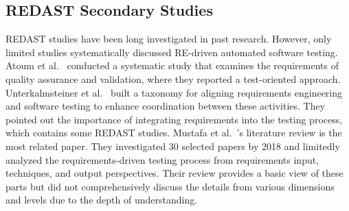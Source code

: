 \subsection{REDAST Secondary Studies}

REDAST studies have been long investigated in past research. However, only limited studies systematically discussed RE-driven automated software testing. Atoum et al.~\cite{atoum2021challenges} conducted a systematic study that examines the requirements of quality assurance and validation, where they reported a test-oriented approach. Unterkalmsteiner et al.~\cite{unterkalmsteiner2015assessing} built a taxonomy for aligning requirements engineering and software testing to enhance coordination between these activities. They pointed out the importance of integrating requirements into the testing process, which contains some REDAST studies. Mustafa et al.~\cite{mustafa2021automated}'s literature review is the most related paper. They investigated 30 selected papers by 2018 and limitedly analyzed the requirements-driven testing process from requirements input, techniques, and output perspectives. Their review provides a basic view of these parts but did not comprehensively discuss the details from various dimensions and levels due to the depth of understanding.
